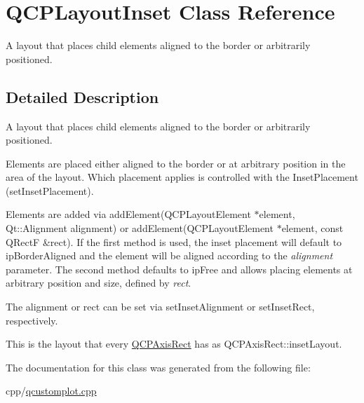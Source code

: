\hypertarget{class_q_c_p_layout_inset}{}\section{Q\+C\+P\+Layout\+Inset Class Reference}
\label{class_q_c_p_layout_inset}


A layout that places child elements aligned to the border or arbitrarily positioned.  




\subsection{Detailed Description}
A layout that places child elements aligned to the border or arbitrarily positioned. 

Elements are placed either aligned to the border or at arbitrary position in the area of the layout. Which placement applies is controlled with the Inset\+Placement (set\+Inset\+Placement).

Elements are added via add\+Element(\+Q\+C\+P\+Layout\+Element $\ast$element, Qt\+::\+Alignment alignment) or add\+Element(\+Q\+C\+P\+Layout\+Element $\ast$element, const Q\+Rect\+F \&rect). If the first method is used, the inset placement will default to ip\+Border\+Aligned and the element will be aligned according to the {\itshape alignment} parameter. The second method defaults to ip\+Free and allows placing elements at arbitrary position and size, defined by {\itshape rect}.

The alignment or rect can be set via set\+Inset\+Alignment or set\+Inset\+Rect, respectively.

This is the layout that every \mbox{\hyperlink{class_q_c_p_axis_rect}{Q\+C\+P\+Axis\+Rect}} has as Q\+C\+P\+Axis\+Rect\+::inset\+Layout. 

The documentation for this class was generated from the following file\+:\begin{DoxyCompactItemize}
\item 
cpp/\mbox{\hyperlink{qcustomplot_8cpp}{qcustomplot.\+cpp}}\end{DoxyCompactItemize}
